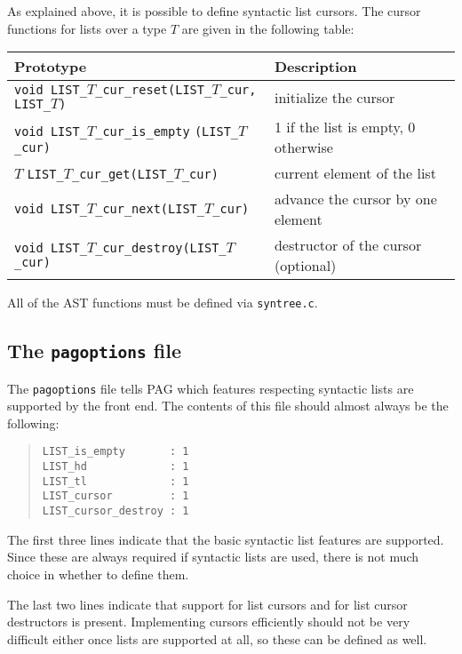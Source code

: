 \documentclass[12pt]{article}
\begin{document}
As explained above, it is possible to define syntactic list cursors.
The cursor functions for lists over a type \(T\) are given in the
following table:

\begin{longtable}{|p{} | p{}|}
\hline
Prototype & Description \\
\hline
\hline
\verb|void LIST_|\(T\)\verb|_cur_reset(LIST_|\(T\)\verb|_cur,|
    \verb|LIST_|\(T\)\verb|)|
    & initialize the cursor \\
\hline
\raggedright
    \verb|void LIST_|\(T\)\verb|_cur_is_empty|
    \verb|(LIST_|\(T\)\verb|_cur)|
    & 1 if the list is empty, 0 otherwise \\
\hline
\(T\) \verb|LIST_|\(T\)\verb|_cur_get(LIST_|\(T\)\verb|_cur)|
    & current element of the list \\
\hline
\verb|void LIST_|\(T\)\verb|_cur_next(LIST_|\(T\)\verb|_cur)|
    & advance the cursor by one element \\
\hline
\verb|void LIST_|\(T\)\verb|_cur_destroy(LIST_|\(T\)\verb|_cur)|
    & destructor of the cursor (optional) \\
\hline
\end{longtable}

All of the AST functions must be defined via \verb|syntree.c|.

\subsection{The {\tt pagoptions} file}

The \verb|pagoptions| file tells PAG which features respecting
syntactic lists are supported by the front end. The contents of this
file should almost always be the following:

\begin{quote}
\begin{verbatim}
LIST_is_empty       : 1
LIST_hd             : 1
LIST_tl             : 1
LIST_cursor         : 1 
LIST_cursor_destroy : 1
\end{verbatim}
\end{quote}

The first three lines indicate that the basic syntactic list
features are supported. Since these are always required if syntactic
lists are used, there is not much choice in whether to define them.

The last two lines indicate that support for list cursors and for
list cursor destructors is present. Implementing cursors efficiently
should not be very difficult either once lists are supported at all,
so these can be defined as well.
\end{document}

